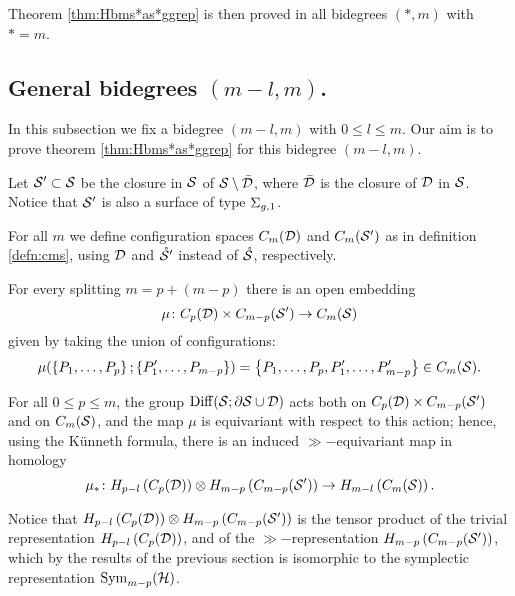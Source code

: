 Theorem \ref{thm:Hbms*as*ggrep} is then proved in all bidegrees $(*,m)$ with $*=m$.

\subsection{General bidegrees $(m-l,m)$.} In this subsection we fix a bidegree $(m-l,m)$
with $0\leq l\leq m$.
Our aim is to prove theorem \ref{thm:Hbms*as*ggrep} for this bidegree $(m-l,m)$.
\begin{defn}
 Let $\S'\subset\S$ be the closure in $\S$ of $\S\setminus\bar\D$, where $\bar\D$ is the closure of $\D$ in $\S$.
 Notice that $\S'$ is also a surface of type $\sg$.
 
 For all $m$ we define configuration spaces $C_m(\D)$ and $C_m(\S')$ as in definition \ref{defn:cms},
 using $\D$ and $\mrS'$ instead of $\mrS$, respectively.
 
 For every splitting $m=p+(m-p)$ there is an open embedding
 \[
 \mu\colon C_p(\D)\times C_{m-p}(\S')\to \cms
 \]
 given by taking the union of configurations:
 \[
  \mu(\set{P_1,\dots,P_p};\set{P'_1,\dots,P_{m-p}})=\set{P_1,\dots,P_p,P'_1,\dots,P'_{m-p}}\in\cms.
 \]
\end{defn}
For all $0\leq p\leq m$, the group $\Diff(\S;\partial\S\cup\D)$ acts both on $C_p(\D)\times C_{m-p}(\S')$
and on $\cms$, and the map $\mu$ is equivariant with respect to this action;
hence, using the K\"{u}nneth formula, there is an induced $\gg-$equivariant map in homology
\begin{equation}
 \label{eq:mu*}
 \mu_*\colon H_{p-l}\pa{C_p(\D)}\otimes H_{m-p}\pa{C_{m-p}(\S')}\to H_{m-l}\pa{\cms}.
\end{equation}

Notice that $H_{p-l}\pa{C_p(\D)}\otimes H_{m-p}\pa{C_{m-p}(\S')}$
is the tensor product of the trivial representation $H_{p-l}\pa{C_p(\D)}$, and
of the $\gg-$representation $H_{m-p}\pa{C_{m-p}(\S')}$, which by the results of the previous
section is isomorphic to the symplectic representation $\Sym_{m-p}(\H)$.

